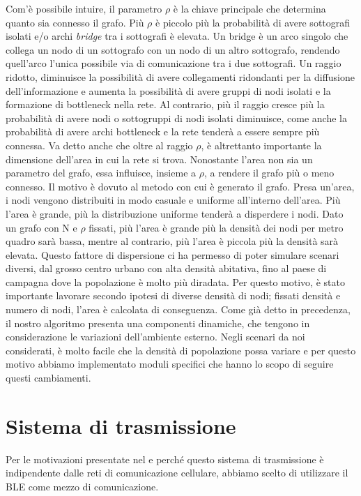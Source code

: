 Com'è possibile intuire, il parametro $\rho$ è la chiave principale che determina quanto sia connesso il grafo. Più $\rho$ è piccolo più la probabilità di avere sottografi isolati e/o archi \textit{bridge} tra i sottografi è elevata. Un bridge è un arco singolo che collega un nodo di un sottografo con un nodo di un altro sottografo, rendendo quell'arco l'unica possibile via di comunicazione tra i due sottografi. Un raggio ridotto, diminuisce la possibilità di avere collegamenti ridondanti per la diffusione dell'informazione e aumenta la possibilità di avere gruppi di nodi isolati e la formazione di bottleneck nella rete. Al contrario, più il raggio cresce più la probabilità di avere nodi o sottogruppi di nodi isolati diminuisce, come anche la probabilità di avere archi bottleneck e la rete tenderà a essere sempre più connessa. Va detto anche che oltre al raggio $\rho$, è altrettanto importante la dimensione dell'area in cui la rete si trova. Nonostante l'area non sia un parametro del grafo, essa influisce, insieme a $\rho$, a rendere il grafo più o meno connesso. Il motivo è dovuto al metodo con cui è generato il grafo. Presa un'area, i nodi vengono distribuiti in modo casuale e uniforme all'interno dell'area. Più l'area è grande, più la distribuzione uniforme tenderà a disperdere i nodi. Dato un grafo con N e $\rho$ fissati, più l'area è grande più la densità dei nodi per metro quadro sarà bassa, mentre al contrario, più l'area è piccola più la densità sarà elevata. Questo fattore di dispersione ci ha permesso di poter simulare scenari diversi, dal grosso centro urbano con alta densità abitativa, fino al paese di campagna dove la popolazione è molto più diradata. Per questo motivo, è stato importante lavorare secondo ipotesi di diverse densità di nodi; fissati densità e numero di nodi, l'area è calcolata di conseguenza. Come già detto in precedenza, il nostro algoritmo presenta una componenti dinamiche, che tengono in considerazione le variazioni dell'ambiente esterno. Negli scenari da noi considerati, è molto facile che la densità di popolazione possa variare e per questo motivo abbiamo implementato moduli specifici che hanno lo scopo di seguire questi cambiamenti.

\section{Sistema di trasmissione}
Per le motivazioni presentate nel  e perché questo sistema di trasmissione è indipendente dalle reti di comunicazione cellulare, abbiamo scelto di utilizzare il \acf{BLE} come mezzo di comunicazione.

